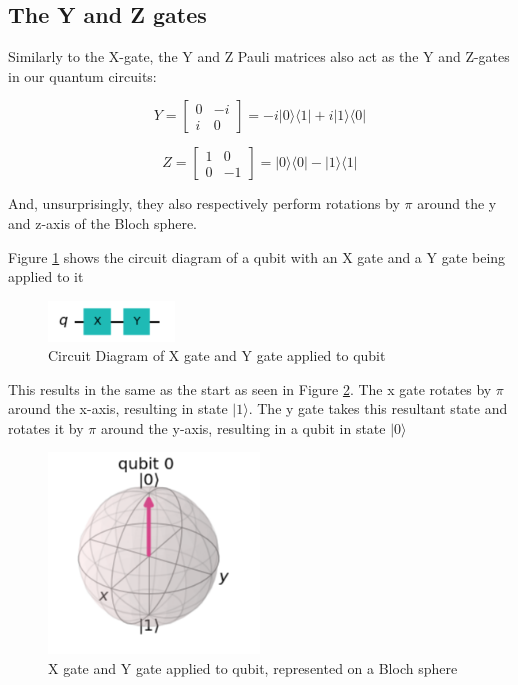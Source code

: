 \subsection{The Y and Z gates}


Similarly to the X-gate, the Y and Z Pauli matrices also act as the Y and Z-gates in our quantum circuits:


$$ Y = \begin{bmatrix} 0 & -i \\ i & 0 \end{bmatrix} = -i|0\rangle\langle1| + i|1\rangle\langle0| $$

$$ Z = \begin{bmatrix} 1 & 0 \\ 0 & -1 \end{bmatrix} = |0\rangle\langle0| - |1\rangle\langle1| $$

And, unsurprisingly, they also respectively perform rotations by $\pi$ around the y and z-axis of the Bloch sphere.

Figure \ref{fig:xyGateDiagram} shows the circuit diagram of a qubit with an X gate and a Y gate being applied to it%

\begin{figure}[h]
    \centering
    \includegraphics[width=0.3\textwidth]{lab2/xyGate.png}
    \caption{Circuit Diagram of X gate and Y gate applied to qubit} 
    \label{fig:xyGateDiagram}
\end{figure}

This results in the same as the start as seen in Figure \ref{fig:xyGateBloc}. The x gate rotates by $\pi$ around the x-axis, resulting in state $|1\rangle$. The y gate takes this resultant state and rotates it by $\pi$ around the y-axis, resulting in a qubit in state $|0\rangle$

\begin{figure}[h]
    \centering
    \includegraphics[width=0.5\textwidth]{lab2/bSphX1.png}
    \caption{X gate and Y gate applied to qubit, represented on a Bloch sphere} 
    \label{fig:xyGateBloc}
\end{figure}

